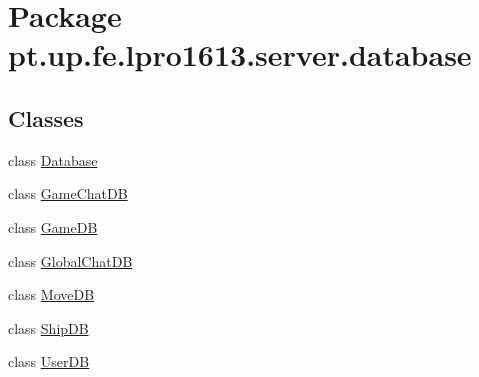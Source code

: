 \hypertarget{namespacept_1_1up_1_1fe_1_1lpro1613_1_1server_1_1database}{}\section{Package pt.\+up.\+fe.\+lpro1613.\+server.\+database}
\label{namespacept_1_1up_1_1fe_1_1lpro1613_1_1server_1_1database}
\subsection*{Classes}
\begin{DoxyCompactItemize}
\item 
class \hyperlink{classpt_1_1up_1_1fe_1_1lpro1613_1_1server_1_1database_1_1_database}{Database}
\item 
class \hyperlink{classpt_1_1up_1_1fe_1_1lpro1613_1_1server_1_1database_1_1_game_chat_d_b}{Game\+Chat\+DB}
\item 
class \hyperlink{classpt_1_1up_1_1fe_1_1lpro1613_1_1server_1_1database_1_1_game_d_b}{Game\+DB}
\item 
class \hyperlink{classpt_1_1up_1_1fe_1_1lpro1613_1_1server_1_1database_1_1_global_chat_d_b}{Global\+Chat\+DB}
\item 
class \hyperlink{classpt_1_1up_1_1fe_1_1lpro1613_1_1server_1_1database_1_1_move_d_b}{Move\+DB}
\item 
class \hyperlink{classpt_1_1up_1_1fe_1_1lpro1613_1_1server_1_1database_1_1_ship_d_b}{Ship\+DB}
\item 
class \hyperlink{classpt_1_1up_1_1fe_1_1lpro1613_1_1server_1_1database_1_1_user_d_b}{User\+DB}
\end{DoxyCompactItemize}
